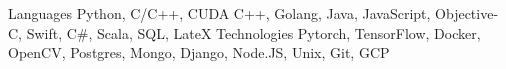 
\begin{cvskills}
  \cvskill
    {Languages} %
    {Python, C/C++, CUDA C++, Golang, Java, JavaScript, Objective-C, Swift, C\#, Scala, SQL, LateX} %
  \cvskill
    {Technologies} %
    {Pytorch, TensorFlow, Docker, OpenCV, Postgres, Mongo, Django, Node.JS, Unix, Git, GCP} %
\end{cvskills}
